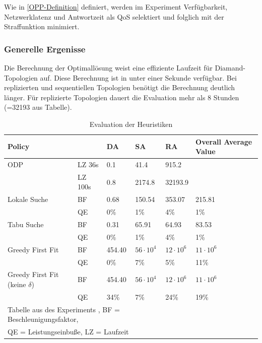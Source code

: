 \documentclass{article}
\begin{document}
Wie in \ref{OPP-Definition} definiert, werden im Experiment Verfügbarkeit, 
Netzwerklatenz und Antwortzeit als QoS selektiert und folglich mit der Straffunktion minimiert. 




\subsubsection{Generelle Ergenisse}
Die Berechnung der Optimallösung weist eine effiziente Laufzeit für Diamand-Topologien auf. 
Diese Berechnung ist in unter einer Sekunde verfügbar. Bei replizierten und sequentiellen Topologien benötigt die Berechnung deutlich länger. 
Für replizierte Topologien dauert die Evaluation mehr als 8 Stunden (=32193 aus Tabelle). \\
\begin{table}[htbp]  
    \centering
    \caption{Evaluation der Heuristiken}
    \begin{tabular}{llllll}
    \toprule
    Policy                           &       & DA        & SA              & RA                & Overall Average Value                  \\
    \midrule
    ODP                              &LZ 36s &  0.1      & 41.4             & 915.2            &                  \\
                                     &LZ 100s&  0.8      & 2174.8           & 32193.9          &                  \\
    \cmidrule{1-5}
    Lokale Suche                     &BF     &  0.68     & 150.54           & 353.07           & 215.81           \\
                                     &QE     &0\%        & 1\%              &4\%               & 1\%              \\
    Tabu Suche                       &BF     &  0.31     & 65.91            & 64.93            & 83.53            \\
                                     &QE     &0\%        & 1\%              &4\%               & 1\%              \\           
    Greedy First Fit                 &BF     &  454.40   & $56 \cdot 10^4$  & $12 \cdot 10^6$  & $11 \cdot 10^6$  \\
                                     &QE     &0\%        & 7\%              &5\%               &11\%              \\
    Greedy First Fit (keine $\delta$)&BF     &  454.40   & $56 \cdot 10^4$  & $12 \cdot 10^6$  & $11 \cdot 10^6$  \\
                                     &QE     &34\%       & 7\%              &24\%              & 19\%             \\
    \bottomrule
    \multicolumn{4}{l}{\footnotesize Tabelle aus des Experiments \cite{efficient-operator-placement}, BF = Beschleunigungsfaktor,}\\
    \multicolumn{4}{l}{\footnotesize QE = Leistungseinbuße, LZ = Laufzeit}\\
    \end{tabular}
    \label{experiment-tabelle}
\end{table} 
\end{document}

